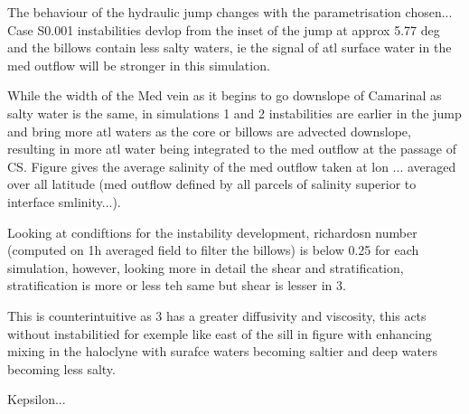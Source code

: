The behaviour of the hydraulic jump changes with the parametrisation chosen... Case S0.001 instabilities devlop from the inset of the jump at approx 5.77 deg and the billows contain less salty waters, ie the signal of atl surface water in the med outflow will be stronger in this simulation.


While the width of the Med vein as it begins to go downslope of Camarinal as salty water is the same, in simulations 1 and 2 instabilities are earlier in the jump and bring more atl waters as the core or billows are advected downslope, resulting in more atl water being integrated to the med outflow at the passage of CS. Figure gives the average salinity of the med outflow taken at lon ... averaged over all latitude (med outflow defined by all parcels of salinity superior to interface smlinity...).

Looking at condiftions for the instability development, richardosn number (computed on 1h averaged field to filter the billows) is below 0.25 for each simulation, however, looking more in detail the shear and stratification, stratification is more or less teh same but shear is lesser in 3.

This is counterintuitive as 3 has a greater diffusivity and viscosity, this acts without instabilitied for exemple like east of the sill in figure with enhancing mixing in the haloclyne with surafce waters becoming saltier and deep waters becoming less salty.

Kepsilon...

